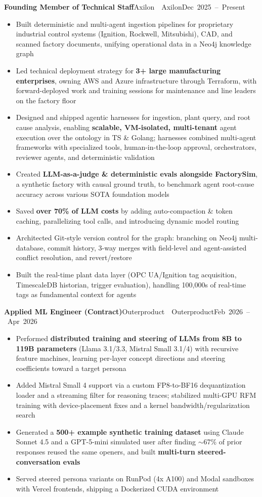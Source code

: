 \documentclass[letterpaper,11pt]{article}
\newcommand{\entry}[3]{%
  \needspace{4\baselineskip}%
  \textbf{#1}\ifx\relax#2\relax\else\ \textbar\ #2\fi\hfill\mbox{#3}\par}
\newenvironment{bullets}
  {\begin{itemize}[leftmargin=1.2em, label=\textbullet, itemsep=0.5pt, parsep=0pt, topsep=2pt]}
  {\end{itemize}\vspace{5pt}}
\begin{document}
\entry{Founding Member of Technical Staff}{Axilon}{Dec 2025 -- Present}
\begin{bullets}
  \item Built deterministic and multi-agent ingestion pipelines for proprietary industrial control systems (Ignition, Rockwell, Mitsubishi), CAD, and scanned factory documents, unifying operational data in a Neo4j knowledge graph
  \item Led technical deployment strategy for \textbf{3+ large manufacturing enterprises}, owning AWS and Azure infrastructure through Terraform, with forward-deployed work and training sessions for maintenance and line leaders on the factory floor
  \item Designed and shipped agentic harnesses for ingestion, plant query, and root cause analysis, enabling \textbf{scalable, VM-isolated, multi-tenant} agent execution over the ontology in TS \& Golang; harnesses combined multi-agent frameworks with specialized tools, human-in-the-loop approval, orchestrators, reviewer agents, and deterministic validation
  \item Created \textbf{LLM-as-a-judge \& deterministic evals alongside FactorySim}, a synthetic factory with causal ground truth, to benchmark agent root-cause accuracy across various SOTA foundation models
  \item Saved \textbf{over 70\% of LLM costs} by adding auto-compaction \& token caching, parallelizing tool calls, and introducing dynamic model routing
  \item Architected Git-style version control for the graph: branching on Neo4j multi-database, commit history, 3-way merges with field-level and agent-assisted conflict resolution, and revert/restore
  \item Built the real-time plant data layer (OPC UA/Ignition tag acquisition, TimescaleDB historian, trigger evaluation), handling 100,000s of real-time tags as fundamental context for agents
\end{bullets}

\entry{Applied ML Engineer (Contract)}{Outerproduct}{Feb 2026 -- Apr 2026}
\begin{bullets}
  \item Performed \textbf{distributed training and steering of LLMs from 8B to 119B parameters} (Llama 3.1/3.3, Mistral Small 3.1/4) with recursive feature machines, learning per-layer concept directions and steering coefficients toward a target persona
  \item Added Mistral Small 4 support via a custom FP8-to-BF16 dequantization loader and a streaming filter for reasoning traces; stabilized multi-GPU RFM training with device-placement fixes and a kernel bandwidth/regularization search
  \item Generated a \textbf{500+ example synthetic training dataset} using Claude Sonnet 4.5 and a GPT-5-mini simulated user after finding $\sim$67\% of prior responses reused the same openers, and built \textbf{multi-turn steered-conversation evals}
  \item Served steered persona variants on RunPod (4x A100) and Modal sandboxes with Vercel frontends, shipping a Dockerized CUDA environment
\end{bullets}
\end{document}
